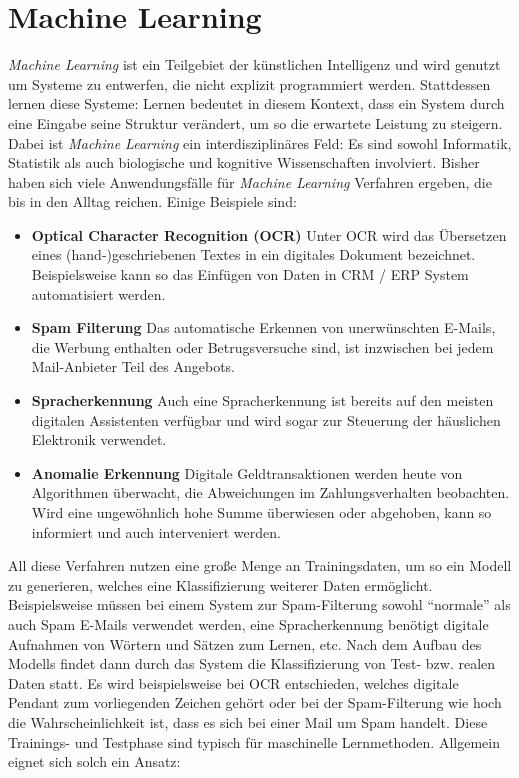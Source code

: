 \section{Machine Learning}

\textit{Machine Learning} ist ein Teilgebiet der künstlichen Intelligenz und wird genutzt um Systeme zu entwerfen, die nicht explizit programmiert werden. Stattdessen lernen diese Systeme: Lernen bedeutet in diesem Kontext, dass ein System durch eine Eingabe seine Struktur verändert, um so die erwartete Leistung zu steigern. Dabei ist \textit{Machine Learning} ein interdisziplinäres Feld: Es sind sowohl Informatik, Statistik als auch biologische und kognitive Wissenschaften involviert. Bisher haben sich viele Anwendungsfälle für \textit{Machine Learning} Verfahren ergeben, die bis in den Alltag reichen. Einige Beispiele sind:

\begin{itemize}
	\item \textbf{Optical Character Recognition (OCR)} Unter OCR wird das Übersetzen eines (hand-)geschriebenen Textes in ein digitales Dokument bezeichnet. Beispielsweise kann so das Einfügen von Daten in CRM / ERP System automatisiert werden.
	\item \textbf{Spam Filterung} Das automatische Erkennen von unerwünschten E-Mails, die Werbung enthalten oder Betrugsversuche sind, ist inzwischen bei jedem Mail-Anbieter Teil des Angebots.
	\item \textbf{Spracherkennung} Auch eine Spracherkennung ist bereits auf den meisten digitalen Assistenten verfügbar und wird sogar zur Steuerung der häuslichen Elektronik verwendet.
	\item \textbf{Anomalie Erkennung} Digitale Geldtransaktionen werden heute von Algorithmen überwacht, die Abweichungen im Zahlungsverhalten beobachten. Wird eine ungewöhnlich hohe Summe überwiesen oder abgehoben, kann so informiert und auch interveniert werden.
\end{itemize}

All diese Verfahren nutzen eine große Menge an Trainingsdaten, um so ein Modell zu generieren, welches eine Klassifizierung weiterer Daten ermöglicht. Beispielsweise müssen bei einem System zur Spam-Filterung sowohl \enquote{normale} als auch Spam E-Mails verwendet werden, eine Spracherkennung benötigt digitale Aufnahmen von Wörtern und Sätzen zum Lernen, etc.
Nach dem Aufbau des Modells findet dann durch das System die Klassifizierung von Test- bzw. realen Daten statt. Es wird beispielsweise bei OCR entschieden, welches digitale Pendant zum vorliegenden Zeichen gehört oder bei der Spam-Filterung wie hoch die Wahrscheinlichkeit ist, dass es sich bei einer Mail um Spam handelt. Diese Trainings- und Testphase sind typisch für maschinelle Lernmethoden. Allgemein eignet sich solch ein Ansatz:

